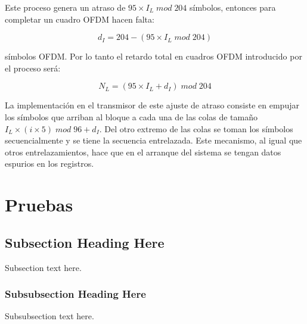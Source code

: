 \documentclass[journal,comsoc]{IEEEtran}
\begin{document}
Este proceso genera un atraso de $95 \times I_L \; mod \; 204$ símbolos, entonces para completar un cuadro OFDM hacen falta:

\begin{equation}
d_I = 204 - (95 \times I_L \; mod \; 204) 
\end{equation}

\noindent símbolos OFDM. Por lo tanto el retardo total en cuadros OFDM introducido por el proceso será:

\begin{equation}
N_L = (95 \times I_L + d_I) \; mod \; 204
\end{equation}

La implementación en el transmisor de este ajuste de atraso consiste en empujar los símbolos que arriban al bloque a cada una de las colas de tamaño $I_L \times (i \times 5) \; mod \; 96 + d_I$. Del otro extremo de las colas se toman los símbolos secuencialmente y se tiene la secuencia entrelazada. Este mecanismo, al igual que otros entrelazamientos, hace que en el arranque del sistema se tengan datos espurios en los registros.



\section{Pruebas}

\subsection{Subsection Heading Here}
Subsection text here.


\subsubsection{Subsubsection Heading Here}
Subsubsection text here.


%
%
\end{document}
